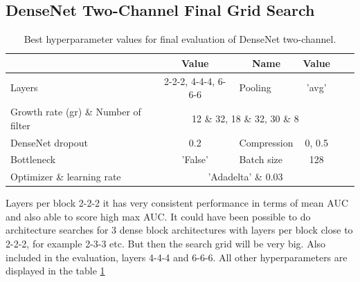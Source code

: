\subsection{DenseNet Two-Channel Final Grid Search}

\begin{table}[ht]
\centering
\caption{Best hyperparameter values for final evaluation of DenseNet two-channel.}
\resizebox{\textwidth}{!}
{\begin{tabular}{|l c| l c| l c|} 
 \hline\hline
 \rowcolor{lightgrey}
 \multicolumn{1}{|c}{\textbf{Name}} & \multicolumn{1}{c|}{\textbf{Value}} & \multicolumn{1}{c}{\textbf{Name}} & \multicolumn{1}{c|}{\textbf{Value}} \\ [0.5ex] 
 \hline
 Layers & 2-2-2, 4-4-4, 6-6-6 & Pooling & 'avg'\\
 \hline
 Growth rate (gr) \& Number of filter & \multicolumn{3}{c|}{12 \& 32, 18 \& 32, 30 \& 8}\\
 
 \hline
 DenseNet dropout & 0.2 & Compression & 0, 0.5 \\ 
 \hline
 Bottleneck & 'False' & Batch size & 128 \\
 \hline
 Optimizer \& learning rate & \multicolumn{3}{c|}{'Adadelta' \& 0.03} \\
 \hline \hline
\end{tabular}}
\label{table:final_run_search_space_dtc}
\end{table}

Layers per block 2-2-2 it has very consistent performance in terms of mean AUC and also able to score high max AUC. It could have been possible to do architecture searches for 3 dense block architectures 
with layers per block close to 2-2-2, for example 2-3-3 etc. But then the search grid will be very big. Also included in the evaluation, layers 4-4-4 and 6-6-6. All other hyperparameters are displayed in the table
\ref{table:final_run_search_space_dtc}
 


